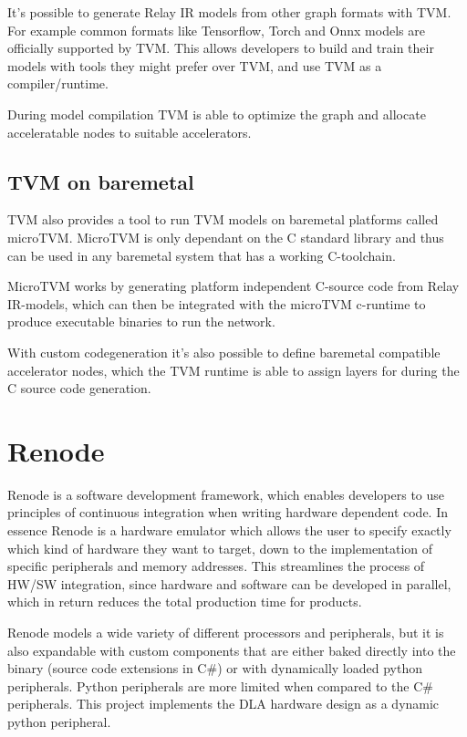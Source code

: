 \documentclass[12pt,a4paper,english
]{tunithesis}
\begin{document}
It's possible to generate Relay IR models from other graph formats with TVM. For example common formats like Tensorflow, Torch and Onnx models are officially supported by TVM. This allows developers to build and train their models with tools they might prefer over TVM, and use TVM as a compiler/runtime.

During model compilation TVM is able to optimize the graph and allocate acceleratable nodes to suitable accelerators.~\parencite{TVM}

\subsection{TVM on baremetal}
TVM also provides a tool to run TVM models on baremetal platforms called microTVM. MicroTVM is only dependant on the C standard library and thus can be used in any baremetal system that has a working C-toolchain.

MicroTVM works by generating platform independent C-source code from Relay IR-models, which can then be integrated with the microTVM c-runtime to produce executable binaries to run the network.

With custom codegeneration it's also possible to define baremetal compatible accelerator nodes, which the TVM runtime is able to assign layers for during the C source code generation.~\parencite{TVM}


\section{Renode}
\label{sec:renode}
Renode is a software development framework, which enables developers to use principles of continuous integration when writing hardware dependent code. In essence Renode is a hardware emulator which allows the user to specify exactly which kind of hardware they want to target, down to the implementation of specific peripherals and memory addresses. This streamlines the process of HW/SW integration, since hardware and software can be developed in parallel, which in return reduces the total production time for products.

Renode models a wide variety of different processors and peripherals, but it is also expandable with custom components that are either baked directly into the binary (source code extensions in C\#) or with dynamically loaded python peripherals. Python peripherals are more limited when compared to the C\# peripherals. This project implements the DLA hardware design as a dynamic python peripheral.
\end{document}
